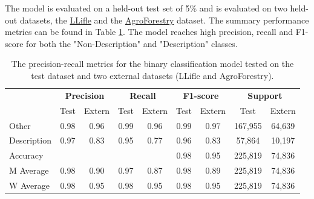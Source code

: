 \documentclass[a4paper, 12pt, oneside]{book} %
\begin{document}
The model is evaluated on a held-out test set of 5\% and is evaluated on two held-out datasets, the \href{http://www.llifle.com/}{LLifle} and the \href{https://www.worldagroforestry.org/}{AgroForestry} dataset.
The summary performance metrics can be found in Table \ref{tab:precision_recall_metrics}.
The model reaches high precision, recall and F1-score for both the "Non-Description" and "Description" classes.
\begin{table}[htpb]
\centering
\caption[Precision-recall metrics test and two left out datasets]{The precision-recall metrics for the binary classification model tested on the test dataset and two external datasets (LLifle and AgroForestry).}
\label{tab:precision_recall_metrics}
\begin{tabular}{@{}lcccccccc@{}}
\cmidrule(l){2-9}
 & \multicolumn{2}{c}{\textbf{Precision}} & \multicolumn{2}{c}{\textbf{Recall}} & \multicolumn{2}{c}{\textbf{F1-score}} & \multicolumn{2}{c}{\textbf{Support}} \\ \cmidrule(l){2-9} 
                 & Test & Extern & Test & Extern & Test & Extern & Test    & Extern \\ \midrule
Other            & 0.98 & 0.96   & 0.99 & 0.96   & 0.99 & 0.97   & 167,955 & 64,639 \\
Description      & 0.97 & 0.83   & 0.95 & 0.77   & 0.96 & 0.83   & 57,864  & 10,197  \\ \midrule
Accuracy         &      &        &      &        & 0.98 & 0.95   & 225,819 & 74,836 \\
M Average        & 0.98 & 0.90   & 0.97 & 0.87   & 0.98 & 0.89   & 225,819 & 74,836 \\
W Average        & 0.98 & 0.95   & 0.98 & 0.95   & 0.98 & 0.95   & 225,819 & 74,836 \\ \bottomrule
\end{tabular}
\end{table}
\end{document}
